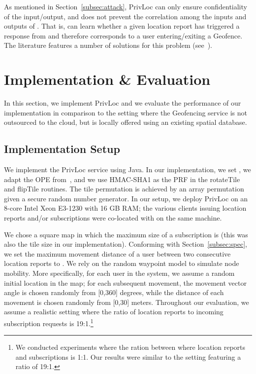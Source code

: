\documentclass{llncs}
\newcommand\sol{{\sf PrivLoc}}
\begin{document}
As mentioned in Section~\ref{subsec:attack}, \sol{} can only ensure confidentiality of the input/output, and does not prevent the correlation among
the inputs and outputs of . That is,  can learn whether a given location report has triggered a response from  and therefore corresponds
to a user entering/exiting a Geofence. The literature features a number of solutions for this problem (see~\cite{Guha:2012:KLP:2228298.2228317,Sweeney:2002:AKA:774544.774553,Sweeney:2002:KAM:774544.774552,Kido05ananonymous}).

\section{Implementation \& Evaluation}\label{sec:implementation}

In this section, we implement \sol{} and we evaluate the performance of our implementation in comparison to the setting where the Geofencing service is not outsourced to the cloud, but is locally offered using an existing spatial database.
\vspace{-0.5 em}
\subsection{Implementation Setup}

We implement the \sol{} service using Java. In our implementation, we set , we adapt the OPE from~\cite{Boldyreva:2009:OSE:1533674.1533691}, and
we use HMAC-SHA1 as the PRF in the {\sf rotateTile} and {\sf flipTile} routines. The tile permutation is achieved
by an array permutation given a secure random number generator. In our setup, we deploy \sol{} on an 8-core Intel Xeon E3-1230 with 16 GB RAM; the various clients issuing location reports and/or subscriptions were co-located with  on the same machine.

We chose a square  map in which the maximum size of a subscription is  (this was also the tile size in
our implementation). Conforming with Section~\ref{subsec:spec}, we set the maximum
 movement distance of a user between two consecutive location reports to . We rely on the random waypoint model to simulate node mobility. More specifically, for each user in the system, we assume a random initial location
 in the map; for each subsequent movement, the movement vector angle is chosen randomly from [0,360] degrees, while the distance of each movement is chosen randomly from [0,30] meters. Throughout our evaluation, we assume a realistic setting where
 the ratio of location reports to incoming subscription requests is 19:1.\footnote{We conducted experiments where the ration between where location reports and subscriptions is 1:1. Our results were similar to the setting featuring a ratio of 19:1.}
\end{document}
